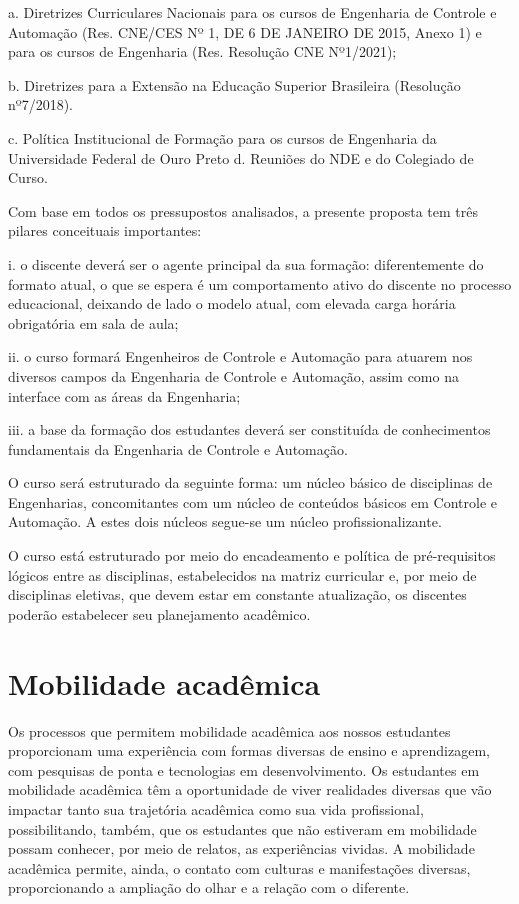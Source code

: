 \documentclass[
	12pt,				%
	openright,			%
	oneside,			%
	a4paper,			%
	english,			%
	brazil				%
	]{abntex2}
\begin{document}
a. Diretrizes Curriculares Nacionais para os cursos de Engenharia de Controle e Automação (Res. CNE/CES Nº 1, DE 6 DE JANEIRO DE 2015, Anexo 1) e para os cursos de Engenharia (Res. Resolução CNE Nº1/2021);

b. Diretrizes para a Extensão na Educação Superior Brasileira (Resolução nº7/2018).

c. Política Institucional de Formação para os cursos de Engenharia da Universidade Federal de Ouro Preto
d. Reuniões do NDE e do Colegiado de Curso.


Com base em todos os pressupostos analisados, a presente proposta tem três pilares conceituais importantes:

i. o discente deverá ser o agente principal da sua formação: diferentemente do formato atual, o que se espera é um comportamento ativo do discente no processo educacional, deixando de lado o modelo atual, com elevada carga horária obrigatória em sala de aula;

ii. o curso formará Engenheiros de Controle e Automação para atuarem nos diversos campos da Engenharia de Controle e Automação, assim como na interface com as áreas da Engenharia;

iii. a base da formação dos estudantes deverá ser constituída de conhecimentos fundamentais da Engenharia de Controle e Automação.

O curso será estruturado da seguinte forma: um núcleo básico de disciplinas de Engenharias, concomitantes com um núcleo de conteúdos básicos em Controle e Automação. A estes dois núcleos segue-se um núcleo profissionalizante.

O curso está estruturado por meio do encadeamento e política de pré-requisitos lógicos entre as disciplinas, estabelecidos na matriz curricular e, por meio de disciplinas eletivas, que devem estar em constante atualização, os discentes poderão estabelecer seu planejamento acadêmico.
%
\chapter{Mobilidade acadêmica}
Os processos que permitem mobilidade acadêmica aos nossos estudantes proporcionam uma experiência com formas diversas de ensino e aprendizagem, com pesquisas de ponta e tecnologias em desenvolvimento. Os estudantes em mobilidade acadêmica têm a oportunidade de viver realidades diversas que vão impactar tanto sua trajetória acadêmica como sua vida profissional, possibilitando, também, que os estudantes que não estiveram em mobilidade possam conhecer, por meio de relatos, as experiências vividas. A mobilidade acadêmica permite, ainda, o contato com culturas e manifestações diversas, proporcionando a ampliação do olhar e a relação com o diferente.
\end{document}

